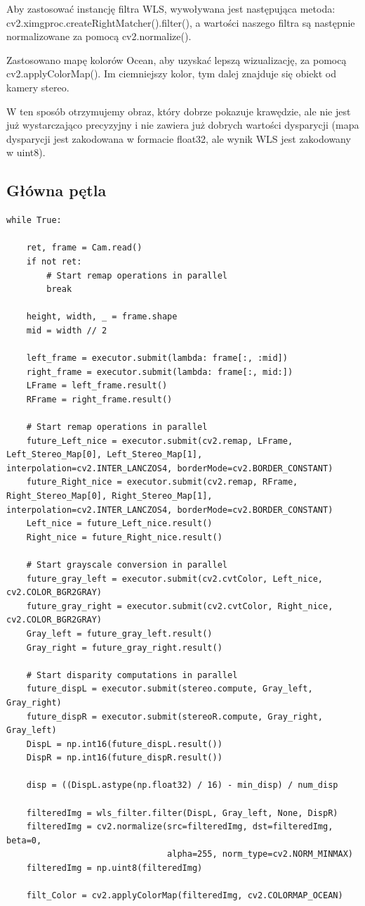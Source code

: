 \documentclass[magisterska]{pracadypl}
\begin{document}
Aby zastosować instancję filtra WLS, wywoływana jest następująca metoda: cv2.ximgproc.createRightMatcher().filter(), a wartości naszego filtra są następnie normalizowane za pomocą cv2.normalize().

Zastosowano mapę kolorów Ocean, aby uzyskać lepszą wizualizację, za pomocą cv2.applyColorMap(). Im ciemniejszy kolor, tym dalej znajduje się obiekt od kamery stereo.

W ten sposób otrzymujemy obraz, który dobrze pokazuje krawędzie, ale nie jest już wystarczająco precyzyjny i nie zawiera już dobrych wartości dysparycji (mapa dysparycji jest zakodowana w formacie float32, ale wynik WLS jest zakodowany w uint8).


\subsection{Główna pętla}

\begin{lstlisting}[style=mypython]
while True:

    ret, frame = Cam.read()
    if not ret:
        # Start remap operations in parallel
        break

    height, width, _ = frame.shape
    mid = width // 2

    left_frame = executor.submit(lambda: frame[:, :mid])
    right_frame = executor.submit(lambda: frame[:, mid:])
    LFrame = left_frame.result()
    RFrame = right_frame.result()

    # Start remap operations in parallel
    future_Left_nice = executor.submit(cv2.remap, LFrame, Left_Stereo_Map[0], Left_Stereo_Map[1], interpolation=cv2.INTER_LANCZOS4, borderMode=cv2.BORDER_CONSTANT)
    future_Right_nice = executor.submit(cv2.remap, RFrame, Right_Stereo_Map[0], Right_Stereo_Map[1], interpolation=cv2.INTER_LANCZOS4, borderMode=cv2.BORDER_CONSTANT)
    Left_nice = future_Left_nice.result()
    Right_nice = future_Right_nice.result()

    # Start grayscale conversion in parallel
    future_gray_left = executor.submit(cv2.cvtColor, Left_nice, cv2.COLOR_BGR2GRAY)
    future_gray_right = executor.submit(cv2.cvtColor, Right_nice, cv2.COLOR_BGR2GRAY)
    Gray_left = future_gray_left.result()
    Gray_right = future_gray_right.result()

    # Start disparity computations in parallel
    future_dispL = executor.submit(stereo.compute, Gray_left, Gray_right)
    future_dispR = executor.submit(stereoR.compute, Gray_right, Gray_left)
    DispL = np.int16(future_dispL.result())
    DispR = np.int16(future_dispR.result())

    disp = ((DispL.astype(np.float32) / 16) - min_disp) / num_disp

    filteredImg = wls_filter.filter(DispL, Gray_left, None, DispR)
    filteredImg = cv2.normalize(src=filteredImg, dst=filteredImg, beta=0, 
                                alpha=255, norm_type=cv2.NORM_MINMAX)
    filteredImg = np.uint8(filteredImg)

    filt_Color = cv2.applyColorMap(filteredImg, cv2.COLORMAP_OCEAN)
\end{lstlisting}
\end{document}
